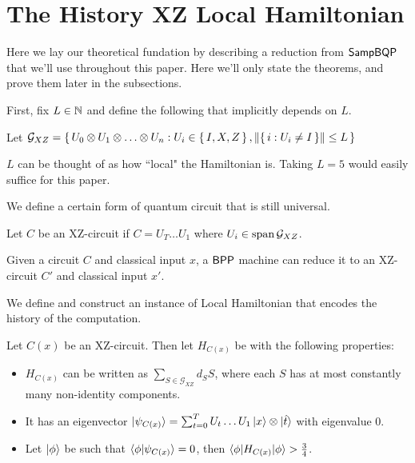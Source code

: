 \section{The History XZ Local Hamiltonian}

Here we lay our theoretical fundation by describing a reduction from $\operatorname{\mathsf{SampBQP}}$ that we'll use throughout this paper. Here we'll only state the theorems, and prove them later in the subsections.

First, fix $L\in\mathbb{N}$ and define the following that implicitly depends on $L$.

\begin{definition}
	Let $\mathcal{G}_{XZ}=\set{U_0\otimes U_1\otimes\ldots\otimes U_n: U_i\in\set{I,X,Z}, \left\lVert\set{i: U_i\ne I}\right\rVert\leq L}$
\end{definition}

$L$ can be thought of as how ``local" the Hamiltonian is. Taking $L=5$ would easily suffice for this paper.

We define a certain form of quantum circuit that is still universal.

\begin{definition}
	Let $C$ be an XZ-circuit if $C=U_T\ldots U_1$ where $U_i\in\operatorname*{\operatorname{span}}\mathcal{G}_{XZ}$.
\end{definition}

\begin{theorem}
	Given a circuit $C$ and classical input $x$, a $\operatorname{\mathsf{BPP}}$ machine can reduce it to an XZ-circuit $C'$ and classical input $x'$.
\end{theorem}

We define and construct an instance of Local Hamiltonian that encodes the history of the computation.

\begin{definition}
	Let $C(x)$ be an XZ-circuit. Then let $H_{C(x)}$ be with the following properties:
	\begin{itemize}
		\item $H_{C(x)}$ can be written as $\sum_{S\in\mathcal{G}_{XZ}} d_S S$, where each $S$ has at most constantly many non-identity components.
		\item It has an eigenvector $\ket{\psi_{C(x)}}=\sum_{t=0}^TU_t\ldots U_1\ket{x}\otimes\ket{\hat{t}}$ with eigenvalue $0$.
		\item Let $\ket\phi$ be such that $\braket{\phi|\psi_{C(x)}}=0$, then $\braket{\phi|H_{C(x)}|\phi}>\frac{3}{4}$.
	\end{itemize}
\end{definition}

